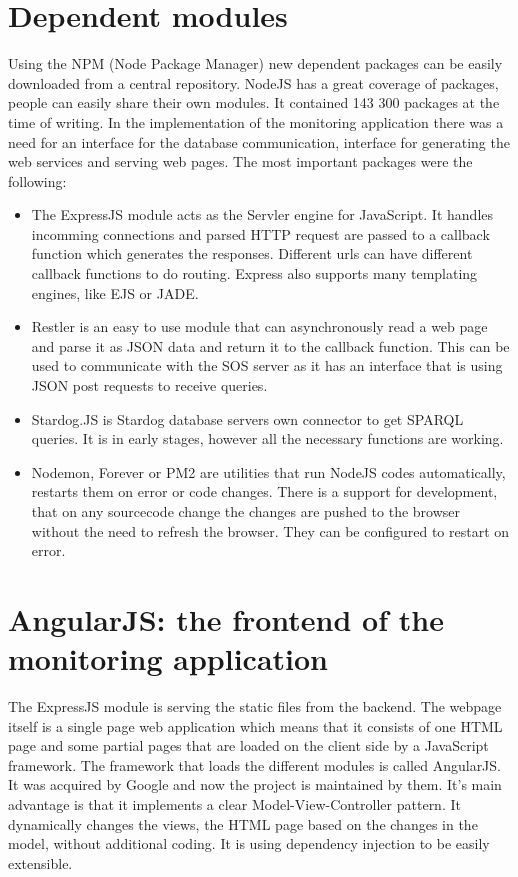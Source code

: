 \section{Dependent modules}

Using the NPM (Node Package Manager) new dependent packages can be easily downloaded from a central  repository. NodeJS has a great coverage of packages, people can easily share their own modules. It contained 143 300 packages at the time of writing. In the implementation of the monitoring application there was a need for an interface for the database communication, interface for generating the web services and serving web pages. The most important packages were the following: 
\begin{itemize}

\item The ExpressJS module acts as the Servler engine for JavaScript. It handles incomming connections and parsed HTTP request are passed to a callback function which generates the responses. Different urls can have different callback functions to do routing. Express also supports many templating engines, like EJS or JADE.

\item Restler is an easy to use module that can asynchronously read a web page and parse it as JSON data and return it to the callback function. This can be used to communicate with the SOS server as it has an interface that is using JSON post requests to 
receive queries.

\item Stardog.JS is Stardog database servers own connector to get SPARQL queries. It is in early stages, however all the necessary functions are working. 

\item Nodemon, Forever or PM2 are utilities that run NodeJS codes automatically, restarts them on error or code changes. There is a support for development, that on any sourcecode change the changes are pushed to the browser without the need to refresh the browser. They can be configured to restart on error.
\end{itemize}

\section{AngularJS: the frontend of the monitoring application}

The ExpressJS module is serving the static files from the backend. The webpage itself is a single page web application which means that it consists of one HTML page and some partial pages that are loaded on the client side by a JavaScript framework. The framework that loads the different modules is called AngularJS. It was acquired by Google and now the project is maintained by them\cite{angular}. It's main advantage is that it implements a clear Model-View-Controller pattern. It dynamically changes the views, the HTML page based on the changes in the model, without additional coding.
It is using dependency injection to be easily extensible.

